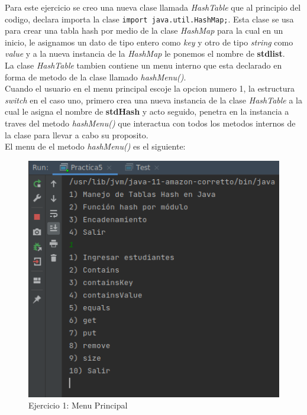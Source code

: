 \documentclass{article}
\begin{document}
			Para este ejercicio se creo una nueva clase llamada \emph{HashTable} que al principio del codigo, declara importa la clase \verb|import java.util.HashMap;|. Esta clase se usa para crear una tabla hash por medio de la clase \emph{HashMap} para la cual en un inicio, le asignamos un dato de tipo entero como \textit{key} y otro de tipo \textit{string} como \textit{value} y a la nueva instancia de la \emph{HashMap} le ponemos el nombre de \textbf{stdlist}.\\
			
			La clase \emph{HashTable} tambien contiene un menu interno que esta declarado en forma de metodo de la clase llamado \emph{hashMenu()}.\\
			
			Cuando el usuario en el menu principal escoje la opcion numero 1, la estructura \textit{switch} en el caso uno, primero crea una nueva instancia de la clase \emph{HashTable} a la cual le asigna el nombre de \textbf{stdHash} y acto seguido, penetra en la instancia a traves del metodo \emph{hashMenu()} que interactua con todos los metodos internos de la clase para llevar a cabo su proposito.\\
			
			El menu de el metodo \emph{hashMenu()} es el siguiente:
		
			\begin{figure}[H]
				\centering
				\includegraphics[scale=0.5]{images/e1.png}
				\caption*{Ejercicio 1: Menu Principal}
			\end{figure}
		
\end{document}
